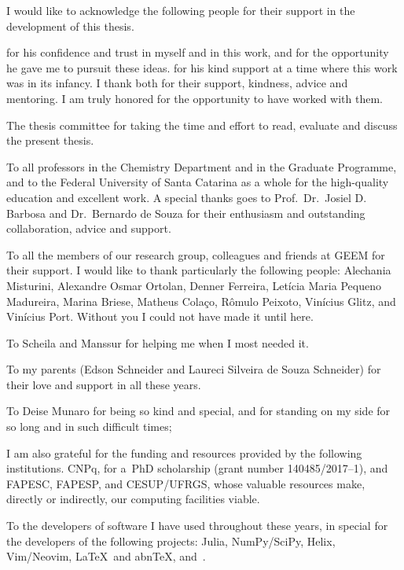 \begin{agradecimentos}[Acknowledgements]
	I would like to acknowledge the following people for their support in the development of this thesis.

	\imprimirorientador{} for his confidence and trust in myself and in this work, and for the opportunity he gave me to pursuit these ideas.
	\imprimircoorientador{} for his kind support at a time where this work was in its infancy.
	I thank both for their support, kindness, advice and mentoring.
	I am truly honored for the opportunity to have worked with them.

	The thesis committee for taking the time and effort to read, evaluate and discuss the present thesis.

	To all professors in the Chemistry Department and in the Graduate Programme, and to the Federal University of Santa Catarina as a whole for the high-quality education and excellent work.
	A special thanks goes to Prof.\ Dr.\ Josiel D. Barbosa and Dr.\ Bernardo de Souza for their enthusiasm and outstanding collaboration, advice and support.

	To all the members of our research group, colleagues and friends at GEEM for their support.
	I would like to thank particularly the following people: Alechania Misturini, Alexandre Osmar Ortolan, Denner Ferreira, Letícia Maria Pequeno Madureira, Marina Briese, Matheus Colaço, Rômulo Peixoto, Vinícius Glitz, and Vinícius Port.
	Without you I could not have made it until here.

	To Scheila and Manssur for helping me when I most needed it.

	To my parents (Edson Schneider and Laureci Silveira de Souza Schneider) for their love and support in all these years.

	To Deise Munaro for being so kind and special, and for standing on my side for so long and in such difficult times;

	I am also grateful for the funding and resources provided by the following institutions.
	CNPq, for a~PhD scholarship (grant number 140485/2017--1), and FAPESC, FAPESP, and CESUP/UFRGS, whose valuable resources make, directly or indirectly, our computing facilities viable.

	To the developers of software I have used throughout these years, in special for the developers of the following projects: Julia, NumPy/SciPy, Helix, Vim/Neovim, \LaTeX\ and abn\TeX{}, and~\cclib{}.
\end{agradecimentos}
